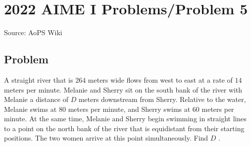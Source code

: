 \documentclass[12pt]{article}
\begin{document}
\section*{{2022 AIME I Problems/Problem 5}}
Source: AoPS Wiki

\subsection*{Problem}
A straight river that is $264$ meters wide flows from west to east at a rate of $14$ meters per minute. Melanie and Sherry sit on the south bank of the river with Melanie a distance of $D$ meters downstream from Sherry. Relative to the water, Melanie swims at $80$ meters per minute, and Sherry swims at $60$ meters per minute. At the same time, Melanie and Sherry begin swimming in straight lines to a point on the north bank of the river that is equidistant from their starting positions. The two women arrive at this point simultaneously. Find $D$ .
\end{document}
